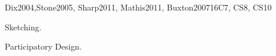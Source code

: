 \begin{syllabus}
\begin{unit}{\HCIUsercentereddesignandtesting}{}{Dix2004,Stone2005, Sharp2011, Mathis2011, Buxton2007}{16}{C7, CS8, CS10}
\begin{topics}
    \item \HCIUsercentereddesignandtestingTopicApproaches
    \item \HCIUsercentereddesignandtestingTopicFunctionality
    \item \HCIUsercentereddesignandtestingTopicTechniques
    \item \HCIUsercentereddesignandtestingTopicTechniquesAnd
    \item \HCIDesigningInteractionTopicTask
    \item \HCIDesignorientedHCITopicConsideration
    \begin{subtopics}
	\item Sketching.
	\item Participatory Design.
    \end{subtopics}
    \item \HCIUsercentereddesignandtestingTopicPrototyping
    \item \HCIDesigningInteractionTopicLow
    \item \HCIDesigningInteractionTopicQuantitative
    \item \HCIUsercentereddesignandtestingTopicEvaluation
    \item \HCIUsercentereddesignandtestingTopicEvaluationWith
    \item \HCIUsercentereddesignandtestingTopicChallenges
    \item \HCIUsercentereddesignandtestingTopicReporting
    \item \HCIUsercentereddesignandtestingTopicInternationalization
\end{topics}
\begin{learningoutcomes}
	\item \HCIDesigningInteractionLOConduct[\Familiarity]
	\item \HCIDesigningInteractionLOForAn [\Familiarity]
	\item \HCIDesigningInteractionLODiscussAt [\Familiarity]
	\item \HCIUsercentereddesignandtestingLOExplainHowDesign [\Familiarity]
	\item \HCIUsercentereddesignandtestingLOUseLo [\Usage]
	\item \HCIUsercentereddesignandtestingLOChooseAppropriate [\Assessment]
	\item \HCIUsercentereddesignandtestingLOUseATechniques [\Assessment]
	\item \HCIUsercentereddesignandtestingLOCompareThe [\Assessment]
\end{learningoutcomes}
\end{unit}


\end{syllabus}
